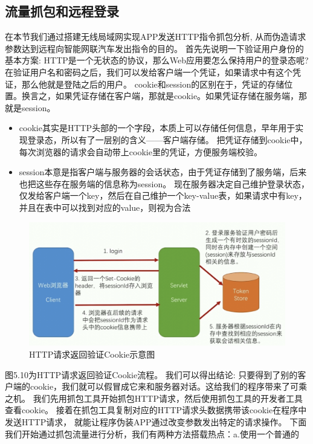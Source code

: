 \subsection[]{流量抓包和远程登录}
在本节我们通过搭建无线局域网实现APP发送HTTP指令抓包分析, 从而伪造请求参数达到远程向智能网联汽车发出指令的目的。
首先先说明一下验证用户身份的基本方案: HTTP是一个无状态的协议，那么Web应用要怎么保持用户的登录态呢?
在验证用户名和密码之后，我们可以发给客户端一个凭证，如果请求中有这个凭证，那么他就是登陆之后的用户。
cookie和session的区别在于，凭证的存储位置。换言之，如果凭证存储在客户端，那就是cookie。如果凭证存储在服务端，那就是session。
\begin{itemize}
  \item cookie其实是HTTP头部的一个字段，本质上可以存储任何信息，早年用于实现登录态，所以有了一层别的含义——客户端存储。
  把凭证存储到cookie中，每次浏览器的请求会自动带上cookie里的凭证，方便服务端校验。
  \item session本意是指客户端与服务器的会话状态，由于凭证存储到了服务端，后来也把这些存在服务端的信息称为session。
  现在服务器决定自己维护登录状态，仅发给客户端一个key，然后在自己维护一个key-value表，如果请求中有key，并且在表中可以找到对应的value，则视为合法
\end{itemize}
\begin{figure}
  \centering
  \includegraphics[scale=0.5]{resources/img/i25.png}
  \caption{HTTP请求返回验证Cookie示意图}
\end{figure} 
图5.10为HTTP请求返回验证Cookie流程。
我们可以得出结论:
只要得到了别的客户端的cookie，我们就可以假冒成它来和服务器对话。这给我们的程序带来了可乘之机。
我们先用抓包工具开始抓包HTTP请求，然后使用抓包工具的开发者工具查看cookie。
接着在抓包工具复制对应的HTTP请求头数据携带该cookie在程序中发送HTTP请求，
就能让程序伪装APP通过改变参数发出特定的请求操作。
\newline
下面我们开始通过抓包流量进行分析，我们有两种方法搭载热点：a.使用一个普通的
